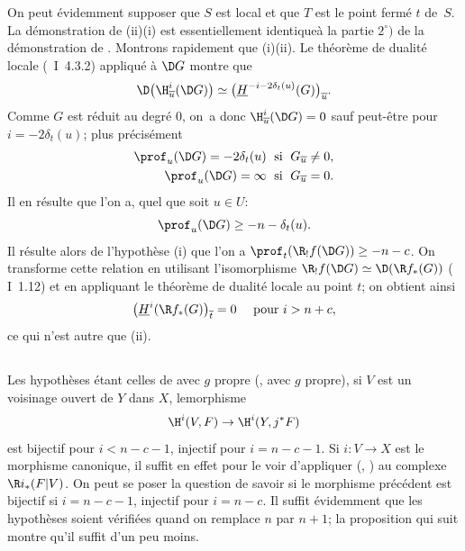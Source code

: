 On peut \'evidemment supposer que $S$ est local et que $T$ est le point ferm\'e $t$ de~$S$. La d\'emonstration de \textup{(ii)}\ALORS\textup{(i)} est essentiellement identique\pageoriginale \`a la partie $2^\circ)$ de la d\'emonstration de . Montrons rapidement que \textup{(i)}\ALORS \textup{(ii)}. Le th\'eor\`eme de dualit\'e locale (~I~4.3.2) appliqu\'e \`a $\D G$ montre que
$$
\D\big(\H_{\overline{u}}^{i}(\D G)\big) \simeq\big(\underline{H}^{-i-2\delta_{t}(u)}(G)\big)_{\overline{u}}.
$$
Comme $G$ est r\'eduit au degr\'e $0$, on~a donc $\H_{\overline{u}}^{i}(\D G)=0$ sauf peut-\^etre pour $i=-2\delta_{t}(u)$; plus pr\'ecis\'ement
\begin{align*}
\prof_{u}(\D G)=-2\delta_{t}(u) &\;\textrm{ si }\; G_{\overline{u}}\neq 0, \\
\prof_{u}(\D G)=\infty &\;\textrm{ si }\; G_{\overline{u}}=0.
\end{align*}
Il en r\'esulte que l'on a, quel que soit $u\in U$:
$$
\prof_{u}(\D G)\geq -n-\delta_{t}(u).
$$
Il r\'esulte alors de l'hypoth\`ese \textup{(i)} que l'on a $\prof_{t}(\R_{!}f(\D G))\geq -n-c$. On transforme cette relation en utilisant l'isomorphisme $\R_{!}f(\D G)\simeq\D(\R f_{\ast}(G))$ ( I~1.12) et en appliquant le th\'eor\`eme de dualit\'e locale au point $t$; on obtient ainsi
$$
\big(\underline{H}^{i}(\R f_{\ast}(G)\big)_{\overline{t}}=0\quad\textrm{ pour }i>n+c,
$$
ce qui n'est autre que \textup{(ii)}.

\subsection{} \label{XIV.4.8} Les hypoth\`eses \'etant celles de  avec $g$ propre (\resp {}, \resp {} avec $g$ propre), si $V$ est un voisinage ouvert de $Y$ dans $X$, le\pageoriginaled morphisme
$$
\H^{i}(V, F)\to\H^{i}(Y, j^{\ast}F)$$
est bijectif pour $i<n-c-1$, injectif pour $i=n-c-1$. Si $i\colon V\to X$ est le morphisme canonique, il suffit en effet pour le voir d'appliquer  (\resp {}, \resp {}) au complexe $\R i_{\ast}(F{|V})$. On peut se poser la question de savoir si le morphisme pr\'ec\'edent est bijectif si $i=n-c-1$, injectif pour $i=n-c$. Il suffit \'evidemment que les hypoth\`eses soient v\'erifi\'ees quand on remplace $n$ par $n+1$; la proposition qui suit montre qu'il suffit d'un peu moins.

